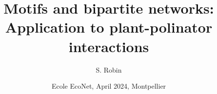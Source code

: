 \documentclass[8pt]{beamer}
\begin{document}
\title[Motifs and bipartite networks]{Motifs and bipartite networks: \\Application to plant-polinator interactions}
\author{S. Robin}
\date[EcoNet, Apr'24]{Ecole EcoNet, April 2024, Montpellier}
\maketitle


\end{document}
